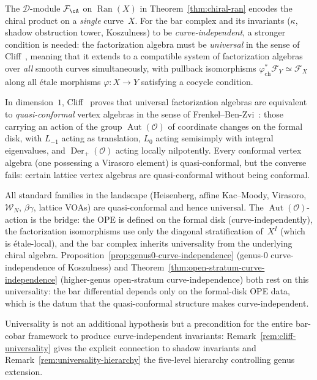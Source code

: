 \begin{remark}
\label{rem:universality-precondition}
The $\mathcal{D}$-module $\mathcal{F}_\cA$ on
$\operatorname{Ran}(X)$ in Theorem~\ref{thm:chiral-ran}
encodes the chiral product on a \emph{single} curve~$X$.
For the bar complex and its invariants ($\kappa$, shadow
obstruction tower, Koszulness) to be \emph{curve-independent},
a stronger condition is needed: the factorization algebra
must be \emph{universal} in the sense of
Cliff~\cite{Cliff19}, meaning that it extends to a
compatible system of factorization algebras over
\emph{all} smooth curves simultaneously, with pullback
isomorphisms $\varphi^*_{\mathrm{ch}}\mathcal{F}_Y
\simeq \mathcal{F}_X$
along all \'etale morphisms $\varphi \colon X \to Y$
satisfying a cocycle condition.

In dimension~$1$, Cliff~\cite[Proposition~8.1]{Cliff19}
proves that universal factorization algebras are equivalent
to \emph{quasi-conformal} vertex algebras in the sense of
Frenkel--Ben-Zvi~\cite[Ch.~6]{FBZ04}: those carrying an
action of the group $\operatorname{Aut}(\mathcal{O})$ of
coordinate changes on the formal disk, with $L_{-1}$
acting as translation, $L_0$ acting semisimply with
integral eigenvalues, and
$\operatorname{Der}_+(\mathcal{O})$ acting locally
nilpotently. Every conformal vertex algebra (one
possessing a Virasoro element) is quasi-conformal, but the
converse fails: certain lattice vertex algebras are
quasi-conformal without being conformal.

All standard families in the landscape (Heisenberg, affine
Kac--Moody, Virasoro, $\mathcal{W}_N$, $\beta\gamma$,
lattice VOAs) are quasi-conformal and hence universal.
The $\operatorname{Aut}(\mathcal{O})$-action is the
bridge: the OPE is defined on the formal disk
(curve-independently), the factorization isomorphisms use
only the diagonal stratification of~$X^I$ (which is
\'etale-local), and the bar complex inherits universality
from the underlying chiral algebra.
Proposition~\ref{prop:genus0-curve-independence}
(genus-$0$ curve-independence of Koszulness) and
Theorem~\ref{thm:open-stratum-curve-independence}
(higher-genus open-stratum curve-independence) both rest on
this universality: the bar differential depends only on the
formal-disk OPE data, which is the datum that the
quasi-conformal structure makes curve-independent.

Universality is not an additional hypothesis but a
precondition for the entire bar-cobar framework to produce
curve-independent invariants:
Remark~\ref{rem:cliff-universality} gives the explicit
connection to shadow invariants and
Remark~\ref{rem:universality-hierarchy} the five-level
hierarchy controlling genus extension.
\end{remark}

